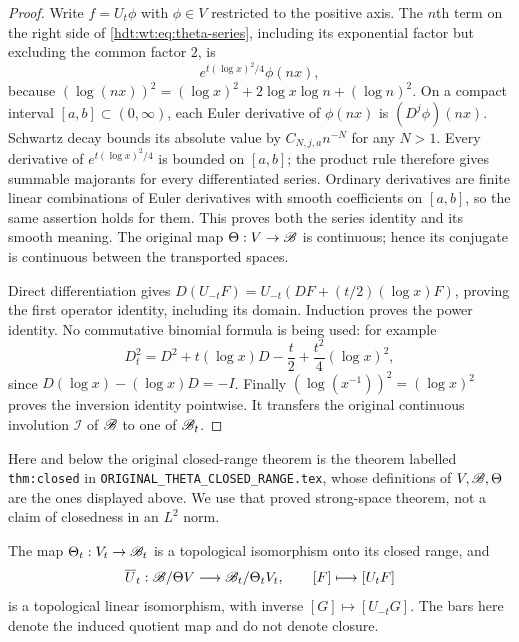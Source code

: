\begin{proof}
Write $f=U_t\phi$ with $\phi\in V$ restricted to the positive
axis.  The $n$th term on the right side of
\eqref{hdt:wt:eq:theta-series}, including its exponential factor but
excluding the common factor $2$, is
\[
 e^{t(\log x)^2/4}\phi(nx),
\]
because
$(\log(nx))^2=(\log x)^2+2\log x\log n+(\log n)^2$.
On a compact interval $[a,b]\subset(0,\infty)$, each Euler
derivative of $\phi(nx)$ is $(D^j\phi)(nx)$.  Schwartz decay
bounds its absolute value by $C_{N,j,a}n^{-N}$ for any $N>1$.
Every derivative of $e^{t(\log x)^2/4}$ is bounded on $[a,b]$;
the product rule therefore gives summable majorants for every
differentiated series.  Ordinary derivatives are finite linear
combinations of Euler derivatives with smooth coefficients on
$[a,b]$, so the same assertion holds for them.  This proves both
the series identity and its smooth meaning.  The original map
$\Theta:V\to\mathscr B$ is continuous; hence its conjugate is continuous
between the transported spaces.

Direct differentiation gives
$D(U_{-t}F)=U_{-t}(DF+(t/2)(\log x)F)$, proving the first
operator identity, including its domain.  Induction proves the
power identity.  No commutative binomial formula is being used:
for example
\[
 D_t^2=D^2+t(\log x)D-\frac t2+\frac{t^2}{4}(\log x)^2,
\]
since $D(\log x)- (\log x)D=-I$.  Finally
$(\log(x^{-1}))^2=(\log x)^2$ proves the inversion identity
pointwise.  It transfers the original continuous involution
$\mathcal I$ of $\mathscr B$ to one of $\mathscr B_t$.
\end{proof}

Here and below the original closed-range theorem is the theorem
labelled \texttt{thm:closed} in
\texttt{ORIGINAL\_THETA\_CLOSED\_RANGE.tex}, whose definitions
of $V,\mathscr B,\Theta$ are the ones displayed above.  We use that proved
strong-space theorem, not a claim of closedness in an $L^2$ norm.

\begin{hdtcorollary}
\label{hdt:wt:cor:quotient}
The map $\Theta_t:V_t\to\mathscr B_t$ is a topological isomorphism
onto its closed range, and
\begin{equation}\label{hdt:wt:eq:strong-quotient}
 \overline U_t:\mathscr B/\Theta V\longrightarrow\mathscr B_t/\Theta_tV_t,
 \qquad [F]\longmapsto[U_tF]
\end{equation}
is a topological linear isomorphism, with inverse
$[G]\mapsto[U_{-t}G]$.  The bars here denote the induced quotient
map and do not denote closure.
\end{hdtcorollary}

